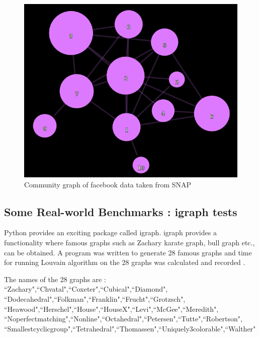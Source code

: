 \begin{figure}[H]
\centering
\includegraphics[scale=0.3]{fb.png}
\caption{\label{digfb}Community graph of facebook data taken from SNAP}
\end{figure}

\subsection{Some Real-world Benchmarks : igraph tests}
Python provides an exciting package called igraph. igraph provides a functionality where famous graphs such as Zachary karate graph, bull graph etc., can be obtained. A program was written to generate 28 famous graphs and time for running Louvain algorithm on the 28 graphs was calculated and recorded \cite{igraph}. 
\par The names of the 28 graphs are : 
\\``Zachary",``Chvatal",``Coxeter",``Cubical",``Diamond",\\
``Dodecahedral",``Folkman",``Franklin",``Frucht",``Grotzsch",\\
``Heawood",``Herschel",``House",``HouseX",``Levi",``McGee",``Meredith",\\
``Noperfectmatching",``Nonline",``Octahedral",``Petersen",``Tutte",``Robertson",\\
``Smallestcyclicgroup",``Tetrahedral",``Thomassen",``Uniquely3colorable",``Walther"\\

